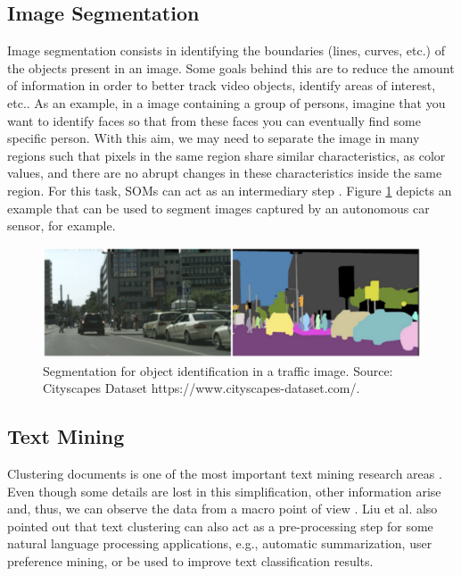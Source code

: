 \subsection{Image Segmentation}

Image segmentation consists in identifying the boundaries (lines, curves, etc.) of the objects present in an image. Some goals behind this are to reduce the amount of information in order to better track video objects, identify areas of interest, etc.. As an example, in a image containing a group of persons, imagine that you want to identify faces so that from these faces you can eventually find some specific person. With this aim, we may need to separate the image in many regions such that pixels in the same region share similar characteristics, as color values, and there are no abrupt changes in these characteristics inside the same region. For this task, SOMs can act as an intermediary step \cite{somImSeg1}\cite{somImSeg2}\cite{somImSeg3}\cite{somImSeg4}. Figure \ref{fig:imgSeg} depicts an example that can be used to segment images captured by an autonomous car sensor, for example. 


\begin{figure}[!h]
\centering
\includegraphics[scale=0.55]{ "Part 3 - Learning Systems/Unsupervised Learning/Self-Organizing Maps/figs/imageSeg.pdf"}
\caption{Segmentation for object identification in a traffic image. Source: Cityscapes Dataset \cite{Cordts2016Cityscapes} https://www.cityscapes-dataset.com/.}
\label{fig:imgSeg}
\end{figure}


\subsection{Text Mining}

Clustering documents is one of the most important text mining research areas \cite{txtmin1}\cite{txtmin2}\cite{txtmin3}. Even though some details are lost in this simplification, other information arise and, thus, we can observe the data from a macro point of view \cite{Liu12}. Liu et al. \cite{Liu12} also pointed out that text clustering can also act as a pre-processing step for some natural language processing applications, e.g., automatic summarization, user preference mining, or be used to improve text classification results. 

